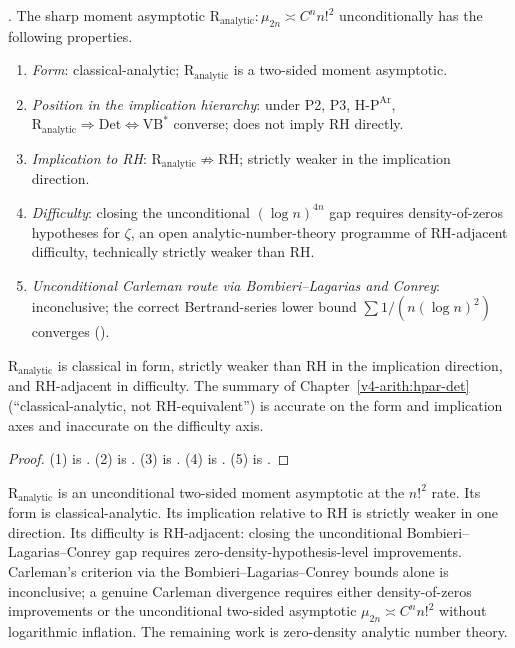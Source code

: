 \begin{theorem}
\label{v4-arith:r-audit:thm:honest-reduction}
\ClaimStatusProvedHere. The sharp moment asymptotic
\(\mathrm{R}_{\mathrm{analytic}}:\mu_{2n}\asymp C^{n}n!^{2}\)
unconditionally has the following properties.
\begin{enumerate}
\item \emph{Form}: classical-analytic; \(\mathrm{R}_{\mathrm{analytic}}\)
is a two-sided moment asymptotic.
\item \emph{Position in the implication hierarchy}: under
P2, P3, \(\mathrm{H\text{-}P}^{\mathrm{Ar}}\),
\(\mathrm{R}_{\mathrm{analytic}}\Rightarrow\mathrm{Det}
\Leftrightarrow\mathrm{VB}^{*}\) converse; does not imply RH
directly.
\item \emph{Implication to RH}:
\(\mathrm{R}_{\mathrm{analytic}}\not\Rightarrow\mathrm{RH}\);
strictly weaker in the implication direction.
\item \emph{Difficulty}: closing the unconditional
\((\log n)^{4n}\) gap requires density-of-zeros hypotheses for
\(\zeta\), an open analytic-number-theory programme of RH-adjacent
difficulty, technically strictly weaker than RH.
\item \emph{Unconditional Carleman route via
Bombieri--Lagarias and Conrey}: inconclusive; the correct
Bertrand-series lower bound \(\sum 1/(n(\log n)^{2})\) converges
().
\end{enumerate}
\(\mathrm{R}_{\mathrm{analytic}}\) is classical in form, strictly
weaker than RH in the implication direction, and RH-adjacent in
difficulty. The summary of Chapter~\ref{v4-arith:hpar-det}
(``classical-analytic, not RH-equivalent'') is accurate on the form
and implication axes and inaccurate on the difficulty axis.
\end{theorem}

\begin{proof}
(1) is .
(2) is .
(3) is .
(4) is .
(5) is .
\end{proof}

\begin{remark}
\label{v4-arith:r-audit:rem:what-delta-should-say}
\(\mathrm{R}_{\mathrm{analytic}}\) is an unconditional two-sided
moment asymptotic at the \(n!^{2}\) rate. Its form is
classical-analytic. Its implication relative to RH is strictly
weaker in one direction. Its difficulty is RH-adjacent: closing the
unconditional Bombieri--Lagarias--Conrey gap requires
zero-density-hypothesis-level improvements. Carleman's criterion
via the Bombieri--Lagarias--Conrey bounds alone is inconclusive; a
genuine Carleman divergence requires either density-of-zeros
improvements or the unconditional two-sided asymptotic
\(\mu_{2n}\asymp C^{n}n!^{2}\) without logarithmic inflation. The
remaining work is zero-density analytic number theory.
\end{remark}


